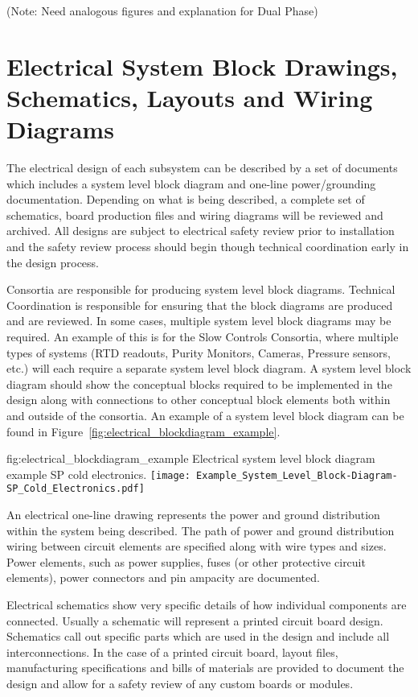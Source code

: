 (Note: Need analogous figures and explanation for Dual Phase)




\section{Electrical System Block Drawings, Schematics, Layouts and Wiring Diagrams}
\label{sec:fdsp-coord-electrical}


The electrical design of each subsystem can be described by a
set of documents which includes a system level block
diagram and one-line power/grounding documentation.
Depending on what is being described, a complete set of schematics,
board production files and wiring diagrams will be reviewed and archived.  All
designs are subject to electrical safety review prior to
installation and the safety review process should begin though
technical coordination early in the design process.


Consortia are responsible for producing system level block
diagrams. Technical Coordination is responsible for ensuring that the
block diagrams are produced and are reviewed.  In some cases, multiple
system level block diagrams may be required.  An example of this is
for the Slow Controls Consortia, where multiple types of systems (RTD
readouts, Purity Monitors, Cameras, Pressure sensors, etc.) will each
require a separate system level block diagram. A system level block
diagram should show the conceptual blocks required to be implemented
in the design along with connections to other conceptual block
elements both within and outside of the consortia.  An example of a
system level block diagram can be found in
Figure~\ref{fig:electrical_blockdiagram_example}.
\begin{dunefigure}{fig:electrical_blockdiagram_example}
  {Electrical system level block diagram example SP cold electronics.}
 \texttt{[image: Example\_System\_Level\_Block-Diagram-SP\_Cold\_Electronics.pdf]}
\end{dunefigure}


An electrical one-line drawing represents the power and ground
distribution within the system being described.  The path of power and
ground distribution wiring between circuit elements are
specified along with wire types and sizes.  Power elements,
such as power supplies, fuses (or other protective circuit elements),
power connectors and pin ampacity are documented.


Electrical schematics show very specific details of how individual
components are connected.  Usually a schematic will represent a
printed circuit board design.  Schematics call out specific
parts which are used in the design and include all interconnections.
In the case of a printed circuit board, layout files, manufacturing
specifications and bills of materials are provided to document
the design and allow for a safety review of any custom boards or
modules.


